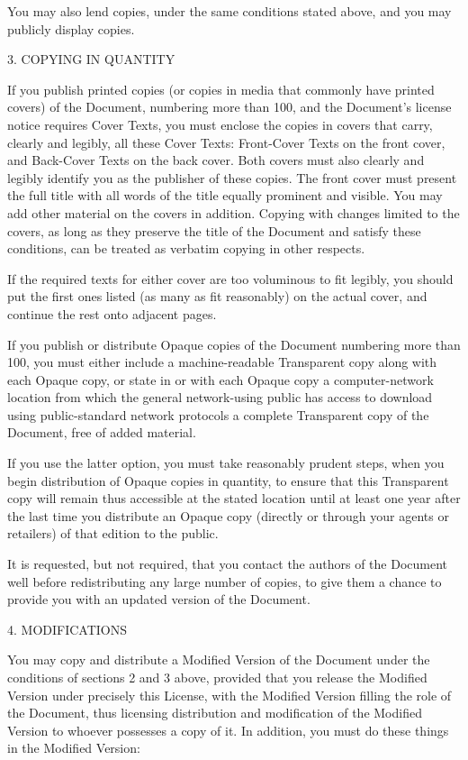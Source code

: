 \documentclass{article}
\begin{document}
You may also lend copies, under the same conditions stated above, and you may publicly display copies. 

3. COPYING IN QUANTITY 

If you publish printed copies (or copies in media that commonly have printed covers) of the Document, numbering more than 100, and the Document's license notice requires Cover Texts, you must enclose the copies in covers that carry, clearly and legibly, all these Cover Texts: Front-Cover Texts on the front cover, and Back-Cover Texts on the back cover. Both covers must also clearly and legibly identify you as the publisher of these copies. The front cover must present the full title with all words of the title equally prominent and visible.  You may add other material on the covers in addition. Copying with changes limited to the covers, as long as they preserve the title of the Document and satisfy these conditions, can be treated as verbatim copying in other respects. 

If the required texts for either cover are too voluminous to fit legibly, you should put the first ones listed (as many as fit reasonably) on the actual cover, and continue the rest onto adjacent pages. 

If you publish or distribute Opaque copies of the Document numbering more than 100, you must either include a machine-readable Transparent copy along with each Opaque copy, or state in or with each Opaque copy a computer-network location from which the general network-using public has access to download using public-standard network protocols a complete Transparent copy of the Document, free of added material. 

If you use the latter option, you must take reasonably prudent steps, when you begin distribution of Opaque copies in quantity, to ensure that this Transparent copy will remain thus accessible at the stated location until at least one year after the last time you distribute an Opaque copy (directly or through your agents or retailers) of that edition to the public. 

It is requested, but not required, that you contact the authors of the Document well before redistributing any large number of copies, to give them a chance to provide you with an updated version of the Document. 

4. MODIFICATIONS 

You may copy and distribute a Modified Version of the Document under the conditions of sections 2 and 3 above, provided that you release the Modified Version under precisely this License, with the Modified Version filling the role of the Document, thus licensing distribution and modification of the Modified Version to whoever possesses a copy of it.  In addition, you must do these things in the Modified Version: 
\end{document}
